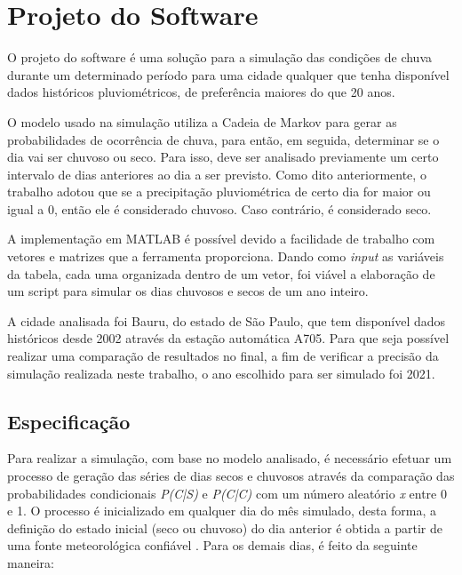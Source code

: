 \pagestyle{simple}
\chapter{Projeto do Software}
\label{c.projeto}

O projeto do software é uma solução para a simulação das condições de chuva durante um determinado período para uma cidade qualquer que tenha disponível dados históricos pluviométricos, de preferência maiores do que 20 anos.

O modelo usado na simulação utiliza a Cadeia de Markov para gerar as probabilidades de ocorrência de chuva, para então, em seguida, determinar se o dia vai ser chuvoso ou seco. Para isso, deve ser analisado previamente um certo intervalo de dias anteriores ao dia a ser previsto. Como dito anteriormente, o trabalho adotou que se a precipitação pluviométrica de certo dia for maior ou igual a 0, então ele é considerado chuvoso. Caso contrário, é considerado seco.

A implementação em MATLAB é possível devido a facilidade de trabalho com vetores e matrizes que a ferramenta proporciona. Dando como \emph{input} as variáveis da tabela, cada uma organizada dentro de um vetor, foi viável a elaboração de um script para simular os dias chuvosos e secos de um ano inteiro.

A cidade analisada foi Bauru, do estado de São Paulo, que tem disponível dados históricos desde 2002 através da estação automática A705. Para que seja possível realizar uma comparação de resultados no final, a fim de verificar a precisão da simulação realizada neste trabalho, o ano escolhido para ser simulado foi 2021.
\section{Especificação}
\label{s.especificacao}

Para realizar a simulação, com base no modelo analisado, é necessário efetuar um processo de geração das séries de dias secos e chuvosos através da comparação das probabilidades condicionais \emph{P(C|S)} e \emph{P(C|C)} com um número aleatório \emph{x} entre 0 e 1. O processo é inicializado em qualquer dia do mês simulado, desta forma, a definição do estado inicial (seco ou chuvoso) do dia anterior é obtida a partir de uma fonte meteorológica confiável \cite{artigo_modelo}. Para os demais dias, é feito da seguinte maneira:

